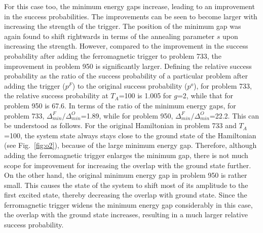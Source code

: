 \documentclass[../main.tex]{subfiles}
\begin{document}
For this case too, the minimum energy gaps increase, leading to an improvement in the success probabilities. The improvements can be seen to become larger with increasing the strength of the trigger. The position of the minimum gap was again found to shift rightwards in terms of the annealing parameter $s$ upon increasing the strength.
However, compared to the improvement in the success probability after adding the ferromagnetic trigger to problem 733, the improvement in problem 950 is significantly larger. Defining the relative success probability as the ratio of the success probability of a particular problem after adding the trigger ($p^F$) to the original success probability ($p^o$), for problem 733, the relative success probability at $T_A$=100 is 1.005 for $g$=2, while that for problem 950 is 67.6. In terms of the ratio of the minimum energy gaps, for problem 733, $\Delta_{min}^F/\Delta_{min}^O$=1.89, while for problem 950, $\Delta_{min}^F/\Delta_{min}^O$=22.2. This can be understood as follows. For the original Hamiltonian in problem 733 and $T_A$=100, the system state always stays close to the ground state of the Hamiltonian (see Fig.~\ref{fig:o2}), because of the large minimum energy gap. Therefore, although adding the ferromagnetic trigger enlarges the minimum gap, there is not much scope for improvement for increasing the overlap with the ground state further. On the other hand, the original minimum energy gap in problem 950 is rather small. This causes the state of the system to shift most of its amplitude to the first excited state, thereby decreasing the overlap with ground state. Since the ferromagnetic trigger widens the minimum energy gap considerably in this case, the overlap with the ground state increases, resulting in a much larger relative success probability. 
\end{document}
